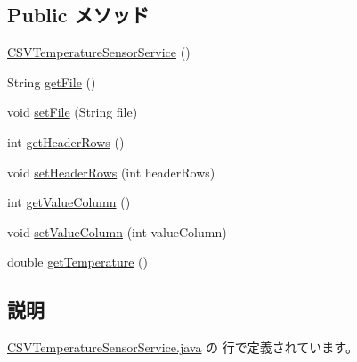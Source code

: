 \subsection*{Public メソッド}
\begin{DoxyCompactItemize}
\item 
\hyperlink{classjp_1_1ac_1_1kyoto__u_1_1i_1_1soc_1_1ai_1_1iostbase_1_1service_1_1iot_1_1_c_s_v_temperature_sensor_service_a53aeff3df2bce1ee564ced8bc24da8c1}{C\-S\-V\-Temperature\-Sensor\-Service} ()
\item 
String \hyperlink{classjp_1_1ac_1_1kyoto__u_1_1i_1_1soc_1_1ai_1_1iostbase_1_1service_1_1iot_1_1_c_s_v_temperature_sensor_service_acafc73661c25a24a59c112dc3b218f31}{get\-File} ()
\item 
void \hyperlink{classjp_1_1ac_1_1kyoto__u_1_1i_1_1soc_1_1ai_1_1iostbase_1_1service_1_1iot_1_1_c_s_v_temperature_sensor_service_a75669134fceb6ce08eda479beb2abd99}{set\-File} (String file)
\item 
int \hyperlink{classjp_1_1ac_1_1kyoto__u_1_1i_1_1soc_1_1ai_1_1iostbase_1_1service_1_1iot_1_1_c_s_v_temperature_sensor_service_afcaf58b6b77051b9c71743466c9328e0}{get\-Header\-Rows} ()
\item 
void \hyperlink{classjp_1_1ac_1_1kyoto__u_1_1i_1_1soc_1_1ai_1_1iostbase_1_1service_1_1iot_1_1_c_s_v_temperature_sensor_service_a02b74257d9f9e98d64ea237a1e2d6d53}{set\-Header\-Rows} (int header\-Rows)
\item 
int \hyperlink{classjp_1_1ac_1_1kyoto__u_1_1i_1_1soc_1_1ai_1_1iostbase_1_1service_1_1iot_1_1_c_s_v_temperature_sensor_service_aba6de5632671e02754266c926d4e6a0b}{get\-Value\-Column} ()
\item 
void \hyperlink{classjp_1_1ac_1_1kyoto__u_1_1i_1_1soc_1_1ai_1_1iostbase_1_1service_1_1iot_1_1_c_s_v_temperature_sensor_service_a9cec7baf2db12e29ec6a64d1ce3c404c}{set\-Value\-Column} (int value\-Column)
\item 
double \hyperlink{classjp_1_1ac_1_1kyoto__u_1_1i_1_1soc_1_1ai_1_1iostbase_1_1service_1_1iot_1_1_c_s_v_temperature_sensor_service_a08855bdae62e7ae4d23380116c462135}{get\-Temperature} ()
\end{DoxyCompactItemize}


\subsection{説明}


 \hyperlink{_c_s_v_temperature_sensor_service_8java_source}{C\-S\-V\-Temperature\-Sensor\-Service.\-java} の  行で定義されています。



